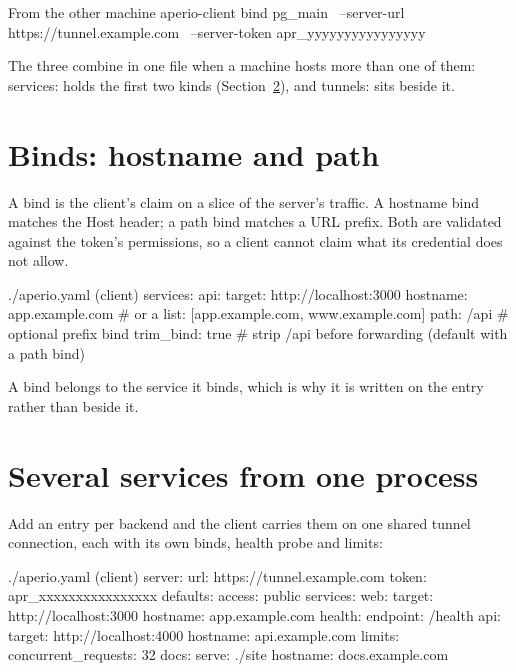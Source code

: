 \documentclass[11pt,a4paper,oneside]{book}
\newcommand{\aperiobreakableunderscore}{\textunderscore\allowbreak}
\newcommand{\aperiocodebreaks}{\XeTeXinterchartokenstate=1 }
\newcommand{\aperiocodebreaks}{}
\DeclareRobustCommand{\code}[1]{{\ttfamily\small\aperiocodebreaks
  \let\_\aperiobreakableunderscore#1}}
\begin{document}
\begin{codecard}[aperiosh]{From the other machine}
aperio-client bind pg_main \
  --server-url https://tunnel.example.com \
  --server-token apr_yyyyyyyyyyyyyyyy
\end{codecard}

The three combine in one file when a machine hosts more than one of them:
\code{services:} holds the first two kinds (Section~\ref{sec:several-services}),
and \code{tunnels:} sits beside it.

\section{Binds: hostname and path}

A bind is the client's claim on a slice of the server's traffic. A
hostname bind matches the \code{Host} header; a path bind matches a URL
prefix. Both are validated against the token's permissions, so a client
cannot claim what its credential does not allow.

\begin{codecard}[aperioyaml]{./aperio.yaml (client)}
services:
  api:
    target: http://localhost:3000
    hostname: app.example.com   # or a list: [app.example.com, www.example.com]
    path: /api                  # optional prefix bind
    trim_bind: true             # strip /api before forwarding (default with a path bind)
\end{codecard}

A bind belongs to the service it binds, which is why it is written on the
entry rather than beside it.

\section{Several services from one process}
\label{sec:several-services}

Add an entry per backend and the client carries them on one shared tunnel
connection, each with its own binds, health probe and limits:

\begin{codecard}[aperioyaml]{./aperio.yaml (client)}
server:
  url: https://tunnel.example.com
  token: apr_xxxxxxxxxxxxxxxx
defaults:
  access: public
services:
  web:
    target: http://localhost:3000
    hostname: app.example.com
    health:
      endpoint: /health
  api:
    target: http://localhost:4000
    hostname: api.example.com
    limits:
      concurrent_requests: 32
  docs:
    serve: ./site
    hostname: docs.example.com
\end{codecard}
\end{document}
